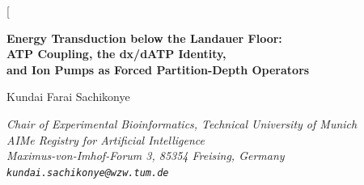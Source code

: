 \documentclass[11pt,twocolumn,a4paper]{article}
\theoremstyle{definition}
\theoremstyle{remark}
\begin{document}
\twocolumn[
\begin{@twocolumnfalse}
\begin{center}

{\LARGE\bfseries Energy Transduction below the Landauer Floor:\\[4pt]
ATP Coupling, the dx/dATP Identity,\\[4pt]
and Ion Pumps as Forced Partition-Depth Operators}

\vspace{12pt}

{\large Kundai Farai Sachikonye}

\vspace{6pt}

{\small\itshape Chair of Experimental Bioinformatics, Technical University of Munich \\[0.3em]
\small\itshape AIMe Registry for Artificial Intelligence \\[0.2em]
\small\itshape Maximus-von-Imhof-Forum 3, 85354 Freising, Germany \\[0.2em]
\texttt{kundai.sachikonye@wzw.tum.de}}

\vspace{6pt}{\small May 2026}

\vspace{16pt}


\end{center}
\end{@twocolumnfalse}
\end{document}
